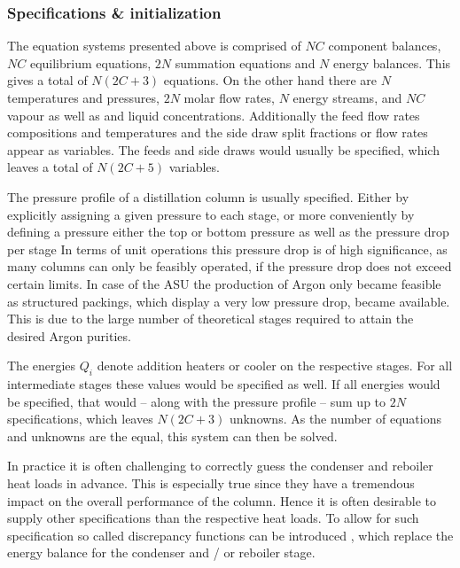     \subsubsection{Specifications \& initialization}
    \label{sec:mathpro:steady:specinit}
        The equation systems presented above is comprised of $NC$ component balances, $NC$ equilibrium
        equations, $2N$ summation equations and $N$ energy balances. This gives a total of $N (2C + 3)$
        equations. On the other hand there are $N$ temperatures and pressures, $2N$ molar flow rates,
        $N$ energy streams, and $NC$ vapour as well as and liquid concentrations. Additionally the feed flow rates
        compositions and temperatures and the side draw split fractions or flow rates appear as variables. The
        feeds and side draws would usually be specified, which leaves a total of $N (2C + 5)$ variables.

        The pressure profile of a distillation column is usually specified. Either by explicitly
        assigning a given pressure to each stage, or more conveniently by defining a pressure
        either the top or bottom pressure as well as the pressure drop per stage
        In terms of unit operations this pressure drop is of high significance,
        as many columns can only be feasibly operated, if the pressure drop does not exceed certain
        limits. In case of the ASU the production of Argon only became feasible as structured
        packings, which display a very low pressure drop, became available. This is due to the large
        number of theoretical stages required to attain the desired Argon purities.

        The energies $Q_i$ denote addition heaters or cooler on the respective stages. For all
        intermediate stages these values would be specified as well. If all energies would be
        specified, that would -- along with the pressure profile -- sum up to $2N$ specifications,
        which leaves $N (2C + 3)$ unknowns. As the number of equations and unknowns are the equal,
        this system can then be solved.

        In practice it is often challenging to correctly guess the condenser and reboiler heat loads in
        advance. This is especially true since they have a tremendous impact on the overall performance
        of the column. Hence it is often desirable to supply other specifications than the respective
        heat loads. To allow for such specification so called discrepancy functions can be introduced
        \cite{Henley.op.2011}, which replace the energy balance for the condenser and / or reboiler stage.

